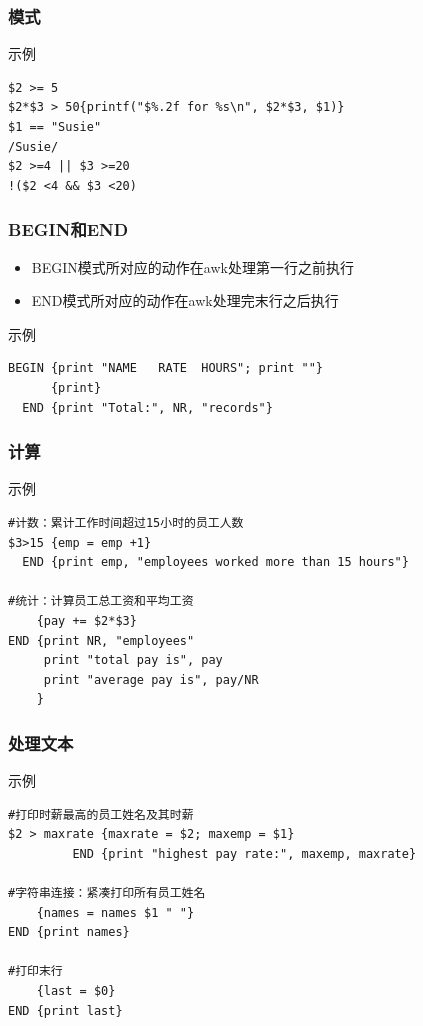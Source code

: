 \documentclass[xcolor=svgnames,presentation]{beamer}
\begin{document}
\begin{frame}[fragile]
\frametitle{模式}
\label{sec-2-2-8}
\begin{exampleblock}{示例}
\label{sec-2-2-8-1}


\begin{verbatim}
$2 >= 5
$2*$3 > 50{printf("$%.2f for %s\n", $2*$3, $1)}
$1 == "Susie"
/Susie/
$2 >=4 || $3 >=20
!($2 <4 && $3 <20)
\end{verbatim}
\end{exampleblock}
\end{frame}
\begin{frame}[fragile]
\frametitle{BEGIN和END}
\label{sec-2-2-9}
\begin{itemize}

\item BEGIN模式所对应的动作在awk处理第一行之前执行
\label{sec-2-2-9-1}%

\item END模式所对应的动作在awk处理完末行之后执行
\label{sec-2-2-9-2}%
\end{itemize} %
\begin{exampleblock}{示例}
\label{sec-2-2-9-3}


\begin{verbatim}
BEGIN {print "NAME   RATE  HOURS"; print ""}
      {print}
  END {print "Total:", NR, "records"}
\end{verbatim}
\end{exampleblock}
\end{frame}
\begin{frame}[fragile]
\frametitle{计算}
\label{sec-2-2-10}
\begin{exampleblock}{示例}
\label{sec-2-2-10-1}


\begin{verbatim}
#计数：累计工作时间超过15小时的员工人数
$3>15 {emp = emp +1}
  END {print emp, "employees worked more than 15 hours"}

#统计：计算员工总工资和平均工资
    {pay += $2*$3}
END {print NR, "employees"
     print "total pay is", pay
     print "average pay is", pay/NR
    }
\end{verbatim}
\end{exampleblock}
\end{frame}
\begin{frame}[fragile]
\frametitle{处理文本}
\label{sec-2-2-11}
\begin{exampleblock}{示例}
\label{sec-2-2-11-1}


\begin{verbatim}
#打印时薪最高的员工姓名及其时薪
$2 > maxrate {maxrate = $2; maxemp = $1}
         END {print "highest pay rate:", maxemp, maxrate}

#字符串连接：紧凑打印所有员工姓名
    {names = names $1 " "}
END {print names}

#打印末行
    {last = $0}
END {print last}
\end{verbatim}
\end{exampleblock}
\end{frame}
\end{document}
